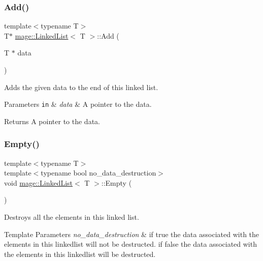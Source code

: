 \subsubsection{\texorpdfstring{Add()}{Add()}}
{\footnotesize\ttfamily template$<$typename T$>$ \\
T$\ast$ \hyperlink{classmage_1_1_linked_list}{mage\+::\+Linked\+List}$<$ T $>$\+::Add (\begin{DoxyParamCaption}\item[{T $\ast$}]{data }\end{DoxyParamCaption})}

Adds the given data to the end of this linked list.


\begin{DoxyParams}[1]{Parameters}
\mbox{\tt in}  & {\em data} & A pointer to the data. \\
\hline
\end{DoxyParams}
\begin{DoxyReturn}{Returns}
A pointer to the data. 
\end{DoxyReturn}
\hypertarget{classmage_1_1_linked_list_a6f57c11ad87c0f6d8f6ae8e785431c39}{}\label{classmage_1_1_linked_list_a6f57c11ad87c0f6d8f6ae8e785431c39} 
\subsubsection{\texorpdfstring{Empty()}{Empty()}}
{\footnotesize\ttfamily template$<$typename T$>$ \\
template$<$typename bool no\+\_\+data\+\_\+destruction$>$ \\
void \hyperlink{classmage_1_1_linked_list}{mage\+::\+Linked\+List}$<$ T $>$\+::Empty (\begin{DoxyParamCaption}{ }\end{DoxyParamCaption})}

Destroys all the elements in this linked list.


\begin{DoxyTemplParams}{Template Parameters}
{\em no\+\_\+data\+\_\+destruction} & if {\ttfamily true} the data associated with the elements in this linkedlist will not be destructed. if {\ttfamily false} the data associated with the elements in this linkedlist will be destructed. \\
\hline
\end{DoxyTemplParams}
\hypertarget{classmage_1_1_linked_list_a97922b200a12979e5c8692dd5f3f73d1}{}\label{classmage_1_1_linked_list_a97922b200a12979e5c8692dd5f3f73d1} 
